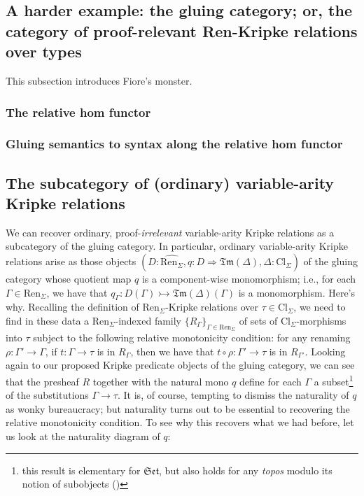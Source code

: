 \documentclass[12pt,twoside]{reedthesis}
\theoremstyle{definition}
\theoremstyle{remark}
\theoremstyle{plain}
\newcommand{\cl}{\text{Cl}_\Sigma}
\newcommand{\ren}{\text{Ren}_\Sigma}
\newcommand{\renhat}{\hat{\ren}}
\newcommand{\tm}{\mathfrak{Tm}}
\newcommand{\catset}{\mathfrak{Set}}
\begin{document}
\subsection{A harder example: the gluing category; or, the category of proof-relevant Ren-Kripke relations over types}
This subsection introduces Fiore's monster.
\subsubsection{The relative hom functor}
\subsubsection{Gluing semantics to syntax along the relative hom functor}
\subsection{The subcategory of (ordinary) variable-arity Kripke relations}


We can recover ordinary, proof-\emph{irrelevant} variable-arity Kripke relations
as a subcategory of the gluing category. In particular, ordinary variable-arity
Kripke relations arise as those objects
\( (D : \renhat, q : D \Longrightarrow \tm (\Delta), \Delta : \cl) \) of the gluing category whose
quotient map $q$ is a component-wise monomorphism; i.e., for each
\( \Gamma \in \ren \), we have that \( q_{\Gamma} : D(\Gamma) \rightarrowtail \tm (\Delta)(\Gamma) \) is a monomorphism.
Here's why. Recalling the definition of $\ren$-Kripke relations over $\tau \in \cl$,
we need to find in these data a $\ren$-indexed family \( \{ R_{\Gamma}\}_{\Gamma \in \ren}\)
of sets of $\cl$-morphisms into \( \tau \) subject to the following relative
monotonicity condition: for any renaming \( \rho : \Gamma' \rightarrow \Gamma \), if \( t : \Gamma \rightarrow \tau \) is
in \( R_{\Gamma}\), then we have that \( t \circ \rho : \Gamma' \rightarrow \tau \) is in \( R_{\Gamma'}\). Looking
again to our proposed Kripke predicate objects of the gluing category, we can
see that the presheaf \( R \) together with the natural mono \( q \) define for
each \( \Gamma \) a subset\footnote{this result is elementary for $\catset$, but also
  holds for any \emph{topos} modulo its notion of subobjects
  (\cite{leinster_informal_2011})} of the substitutions \( \Gamma \rightarrow \tau \). It is, of
course, tempting to dismiss the naturality of $q$ as wonky bureaucracy; but
naturality turns out to be essential to recovering the relative monotonicity
condition. To see why this recovers what we had before, let us look at the
naturality diagram of \( q \):
\end{document}
